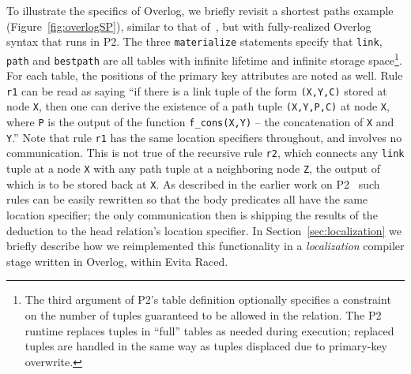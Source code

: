 \documentclass{sigmod08}
\newcommand{\ol}[1]{\texttt{\small #1}\xspace}
\begin{document}
        To illustrate the specifics of Overlog, we briefly revisit a shortest
        paths example (Figure~\ref{fig:overlogSP}), similar to that
        of~\cite{loo-sigmod06}, but with fully-realized Overlog syntax that runs
        in P2.  The three \ol{materialize} statements specify that \ol{link},
        \ol{path} and \ol{bestpath} are all tables with infinite lifetime and
        infinite storage space\footnote{The third argument of P2's table
          definition optionally specifies a constraint on the number of tuples
          guaranteed to be allowed in the relation. The P2 runtime replaces
          tuples in ``full'' tables as needed during execution; replaced tuples
          are handled in the same way as tuples displaced due to primary-key overwrite.}.  
        For each table, the positions of the primary key attributes are noted as well.  
        Rule \ol{r1} can be read as saying ``if there is a link tuple of the form \ol{(X,Y,C)} stored at node \ol{X}, then one can derive the existence of a path tuple \ol{(X,Y,P,C)} at node \ol{X}, where \ol{P} is the output of the function \ol{f\_cons(X,Y)} -- the concatenation of \ol{X} and \ol{Y}.''  
Note that rule \ol{r1} has the same location specifiers throughout, and
        involves no communication.  This is not true of the recursive
        rule \ol{r2}, which connects any \ol{link} tuple at a node
        \ol{X} with any path tuple at a neighboring node \ol{Z}, the
        output of which is to be stored back at \ol{X}. As described in
        the earlier work on P2~\cite{loo-sigcomm05,loo-sigmod06} such
        rules can be easily rewritten so that the body predicates all
        have the same location specifier; the only communication then is
        shipping the results of the deduction to the head relation's
        location specifier.  In Section~\ref{sec:localization} we
        briefly describe how we reimplemented this functionality in a
        \emph{localization} compiler stage written in Overlog, within
        Evita Raced.



\end{document}
